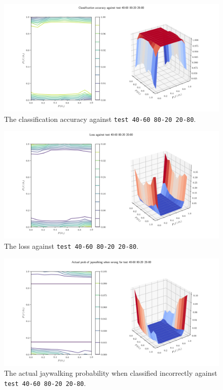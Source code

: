 \documentclass{report}
\newcommand{\code}{\texttt}
\begin{document}
% 
% 

\begin{figure}[h]
    \centering
    \centerline{\includegraphics[scale=0.55]{test_40-60_80-20_20-80_accuracy.png}}
    \caption[]{The classification accuracy against \code{test 40-60 80-20 20-80}.}
    \label{fig:test_40-60_80-20_20-80_accuracy_plot}
\end{figure}

\begin{figure}[h]
    \centering
    \centerline{\includegraphics[scale=0.55]{test_40-60_80-20_20-80_loss.png}}
    \caption[]{The loss against \code{test 40-60 80-20 20-80}.}
    \label{fig:test_40-60_80-20_20-80_loss_plot}
\end{figure}

\begin{figure}[h]
    \centering
    \centerline{\includegraphics[scale=0.55]{test_40-60_80-20_20-80_jay_prob.png}}
    \caption[]{The actual jaywalking probability when classified incorrectly against \code{test 40-60 80-20 20-80}.}
    \label{fig:test_40-60_80-20_20-80_jay_prob_plot}
\end{figure}
\end{document}
